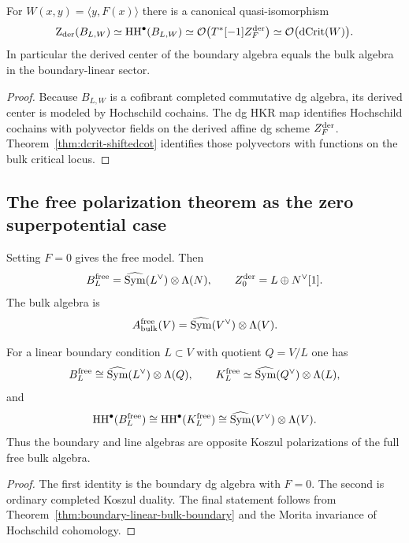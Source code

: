 \begin{theorem}%
For $W(x,y)=\langle y,F(x)\rangle$ there is a canonical quasi-isomorphism
\[
\operatorname{Z}_{\mathrm{der}}(B_{L,W})
\simeq
\operatorname{HH}^\bullet(B_{L,W})
\simeq
\mathcal O\bigl(T^*[-1]Z_F^{\mathrm{der}}\bigr)
\simeq
\mathcal O\bigl(\operatorname{dCrit}(W)\bigr).
\]
In particular the derived center of the boundary algebra equals the bulk algebra in the boundary-linear sector.
\end{theorem}

\begin{proof}
Because $B_{L,W}$ is a cofibrant completed commutative dg algebra, its derived center is modeled by Hochschild cochains. The dg HKR map identifies Hochschild cochains with polyvector fields on the derived affine dg scheme $Z_F^{\mathrm{der}}$. Theorem~\ref{thm:dcrit-shiftedcot} identifies those polyvectors with functions on the bulk critical locus.
\end{proof}

\subsection{The free polarization theorem as the zero superpotential case}

Setting $F=0$ gives the free model. Then
\[
B_L^{\mathrm{free}}
=
\widehat{\operatorname{Sym}}(L^\vee)\otimes \Lambda(N),
\qquad
Z_0^{\mathrm{der}}=L\oplus N^\vee[1].
\]
The bulk algebra is
\[
A_{\mathrm{bulk}}^{\mathrm{free}}(V)
=
\widehat{\operatorname{Sym}}(V^\vee)\otimes \Lambda(V).
\]

\begin{corollary}%
For a linear boundary condition $L\subset V$ with quotient $Q=V/L$ one has
\[
B_L^{\mathrm{free}}\cong \widehat{\operatorname{Sym}}(L^\vee)\otimes \Lambda(Q),
\qquad
K_L^{\mathrm{free}}\simeq \widehat{\operatorname{Sym}}(Q^\vee)\otimes \Lambda(L),
\]
and
\[
\operatorname{HH}^\bullet(B_L^{\mathrm{free}})
\cong
\operatorname{HH}^\bullet(K_L^{\mathrm{free}})
\cong
\widehat{\operatorname{Sym}}(V^\vee)\otimes \Lambda(V).
\]
Thus the boundary and line algebras are opposite Koszul polarizations of the full free bulk algebra.
\end{corollary}

\begin{proof}
The first identity is the boundary dg algebra with $F=0$. The second is ordinary completed Koszul duality. The final statement follows from Theorem~\ref{thm:boundary-linear-bulk-boundary} and the Morita invariance of Hochschild cohomology.
\end{proof}


